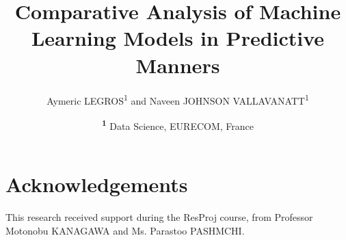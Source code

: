 \documentclass[twocolumn]{NobArticle}
\title{\centering Comparative Analysis of Machine Learning Models in Predictive Manners}
\author{\centering
    Aymeric LEGROS\textsuperscript{1}
    and Naveen JOHNSON VALLAVANATT\textsuperscript{1}
}
\date{\centering
    \textsuperscript{\textbf{1}}
    Data Science, EURECOM, France \\
}
\begin{document}
\small
\maketitle







\section*{Acknowledgements}
This research received support during the ResProj course, from Professor Motonobu KANAGAWA and Ms. Parastoo PASHMCHI.

\printbibliography
\end{document}

